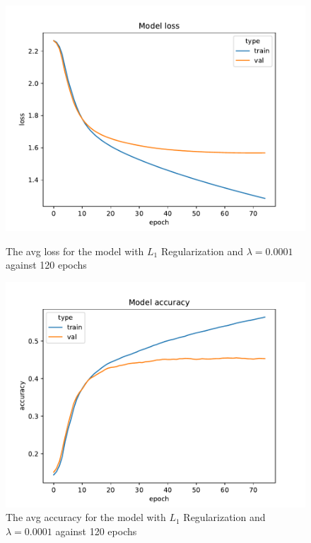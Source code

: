\documentclass{article}
\begin{document}
    \begin{figure}[H]
        \begin{minipage}[b]{0.5\linewidth}
            \centering
            \includegraphics[width=\textwidth]{../plots/config_2d_L1_-4_0.001_loss}
            \caption{The avg loss for the model with $L_1$ Regularization and $\lambda = 0.0001$ against 120 epochs}
            \label{fig:figure9}
        \end{minipage}
        \hspace{0.2cm}
        \begin{minipage}[b]{0.5\linewidth}
            \centering
            \includegraphics[width=\textwidth]{../plots/config_2d_L1_-4_0.001_accuracy}
            \caption{The avg accuracy for the model with $L_1$ Regularization and $\lambda = 0.0001$ against 120 epochs}
            \label{fig:figure10}
        \end{minipage}
    \end{figure}
\end{document}
